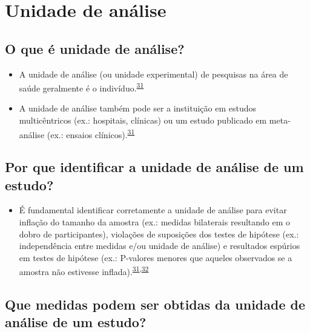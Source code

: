 \documentclass[
  a4paper,
]{book}
\providecommand{\tightlist}{%
  \setlength{\itemsep}{0pt}\setlength{\parskip}{0pt}}
\begin{document}
\hypertarget{unidade-analise}{%
\section{Unidade de análise}\label{unidade-analise}}

\hypertarget{o-que-uxe9-unidade-de-anuxe1lise}{%
\subsection{O que é unidade de análise?}\label{o-que-uxe9-unidade-de-anuxe1lise}}

\begin{itemize}
\item
  A unidade de análise (ou unidade experimental) de pesquisas na área de saúde geralmente é o indivíduo.\textsuperscript{\protect\hyperlink{ref-Altman1997}{31}}
\item
  A unidade de análise também pode ser a instituição em estudos multicêntricos (ex.: hospitais, clínicas) ou um estudo publicado em meta-análise (ex.: ensaios clínicos).\textsuperscript{\protect\hyperlink{ref-Altman1997}{31}}
\end{itemize}

\hypertarget{por-que-identificar-a-unidade-de-anuxe1lise-de-um-estudo}{%
\subsection{Por que identificar a unidade de análise de um estudo?}\label{por-que-identificar-a-unidade-de-anuxe1lise-de-um-estudo}}

\begin{itemize}
\tightlist
\item
  É fundamental identificar corretamente a unidade de análise para evitar inflação do tamanho da amostra (ex.: medidas bilaterais resultando em o dobro de participantes), violações de suposições dos testes de hipótese (ex.: independência entre medidas e/ou unidade de análise) e resultados espúrios em testes de hipótese (ex.: P-valores menores que aqueles observados se a amostra não estivesse inflada).\textsuperscript{\protect\hyperlink{ref-Altman1997}{31},\protect\hyperlink{ref-Matthews1990}{32}}
\end{itemize}

\hypertarget{que-medidas-podem-ser-obtidas-da-unidade-de-anuxe1lise-de-um-estudo}{%
\subsection{Que medidas podem ser obtidas da unidade de análise de um estudo?}\label{que-medidas-podem-ser-obtidas-da-unidade-de-anuxe1lise-de-um-estudo}}
\end{document}
